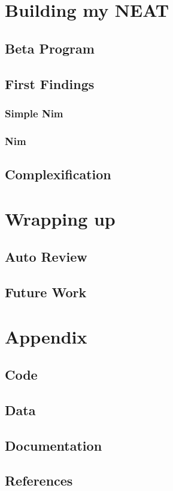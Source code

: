 \documentclass[11pt, a4paper, notitlepage]{report}
\begin{document}
    \chapter{Building my NEAT}
        \section{Beta Program}
        \section{First Findings}
            \subsection{Simple Nim}
            \subsection{Nim}
        \section{Complexification}
    \chapter{Wrapping up}
        \section{Auto Review}
        \section{Future Work}
    \chapter{Appendix}
        \section{Code}
        \section{Data}
        \section{Documentation}
        \section{References}
\end{document}
